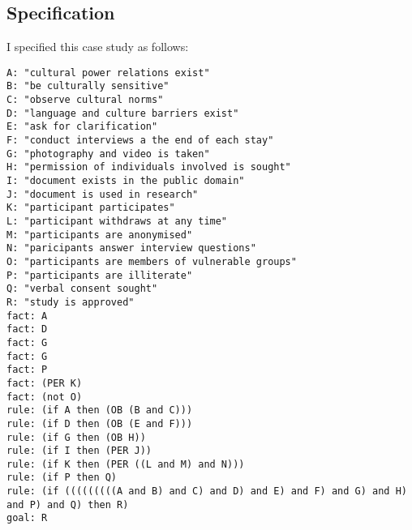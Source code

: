 \documentclass{l4proj}
\begin{document}
\subsection{Specification}
I specified this case study as follows: 
\begin{verbatim}
A: "cultural power relations exist"
B: "be culturally sensitive"
C: "observe cultural norms"
D: "language and culture barriers exist"
E: "ask for clarification"
F: "conduct interviews a the end of each stay"
G: "photography and video is taken"
H: "permission of individuals involved is sought"
I: "document exists in the public domain"
J: "document is used in research"
K: "participant participates"
L: "participant withdraws at any time"
M: "participants are anonymised"
N: "paricipants answer interview questions"
O: "participants are members of vulnerable groups"
P: "participants are illiterate"
Q: "verbal consent sought"
R: "study is approved"
fact: A
fact: D
fact: G
fact: G
fact: P
fact: (PER K)
fact: (not O)
rule: (if A then (OB (B and C)))
rule: (if D then (OB (E and F)))
rule: (if G then (OB H))
rule: (if I then (PER J))
rule: (if K then (PER ((L and M) and N)))
rule: (if P then Q)
rule: (if (((((((((A and B) and C) and D) and E) and F) and G) and H) and P) and Q) then R)
goal: R
\end{verbatim}
\end{document}
